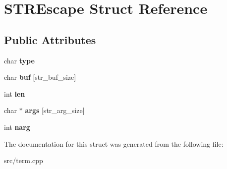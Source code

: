 \hypertarget{structSTREscape}{}\section{S\+T\+R\+Escape Struct Reference}
\label{structSTREscape}
\subsection*{Public Attributes}
\begin{DoxyCompactItemize}
\item 
\mbox{\label{structSTREscape_a4b2aad1b7bca5e613599c071f3ba5832}} 
char {\bfseries type}
\item 
\mbox{\label{structSTREscape_a066b8e566c1542a25814acf5f72e62e8}} 
char {\bfseries buf} \mbox{[}str\+\_\+buf\+\_\+size\mbox{]}
\item 
\mbox{\label{structSTREscape_ac4dd2d8229b28889aa63b1ae61d7ab5a}} 
int {\bfseries len}
\item 
\mbox{\label{structSTREscape_ae9b8f21d68d68c560712eacbd12ad00c}} 
char $\ast$ {\bfseries args} \mbox{[}str\+\_\+arg\+\_\+size\mbox{]}
\item 
\mbox{\label{structSTREscape_acb0d01749271d5621acdc301f7c8c7f8}} 
int {\bfseries narg}
\end{DoxyCompactItemize}


The documentation for this struct was generated from the following file\+:\begin{DoxyCompactItemize}
\item 
src/term.\+cpp\end{DoxyCompactItemize}
